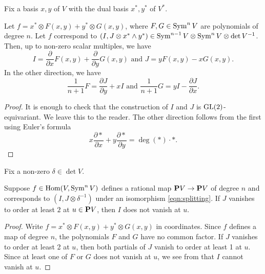 \documentclass{amsart}
\begin{document}
Fix a basis \(x,y\) of \(V\) with the dual basis \(x^{*}, y^{*}\) of \(V^{*}\).
\begin{proposition}\label{prop:fgab}
  Let \(f = x^{*} \otimes F(x,y) + y^{*} \otimes G(x,y)\), where \(F, G \in \Sym^nV\) are polynomials of degree \(n\).
  Let \(f\) correspond to \((I,J \otimes x^{*} \wedge y^{*}) \in \Sym^{n-1}V \otimes \Sym^nV \otimes \det V^{-1}\).
  Then, up to non-zero scalar multiples, we have
  \[I = \frac{\partial}{\partial x}F(x,y) + \frac{\partial}{\partial y}G(x,y) \text{ and }  J = yF(x,y) - xG(x,y).\]
  In the other direction, we have
  \[ \frac{1}{n+1} F = \frac{\partial J}{\partial y} + xI \text{ and } \frac{1}{n+1} G = yI - \frac{\partial J}{\partial x}.\]
\end{proposition}
\begin{proof}
  It is enough to check that the construction of \(I\) and \(J\) is \(\GL(2)\)-equivariant.
  We leave this to the reader.
  The other direction follows from the first using Euler's formula
  \[ x\frac{\partial *}{\partial x} + y\frac{\partial *}{\partial y}  = \deg(*) \cdot *.\]
\end{proof}

Fix a non-zero \(\delta \in \det V\).
\begin{proposition}\label{prop:ab}
  Suppose \(f \in \Hom(V, \Sym^nV)\) defines a rational map \(\P V \to \P V\) of degree \(n\) and corresponds to \((I, J \otimes \delta^{-1})\) under an isomorphism \eqref{eqn:splitting}.
  If \(J\) vanishes to order at least \(2\) at \(u \in \P V\), then \(I\) does not vanish at \(u\).
\end{proposition}
\begin{proof}
  Write \(f = x^{*} \otimes F(x,y) + y^{*} \otimes G(x,y)\) in coordinates.
  Since \(f\) defines a map of degree \(n\), the polynomials \(F\) and \(G\) have no common factor.
  If \(J\) vanishes to order at least 2 at \(u\), then both partials of \(J\) vanish to order at least 1 at \(u\).
  Since at least one of \(F\) or \(G\) does not vanish at \(u\), we see from  that \(I\) cannot vanish at \(u\).
\end{proof}
\end{document}
